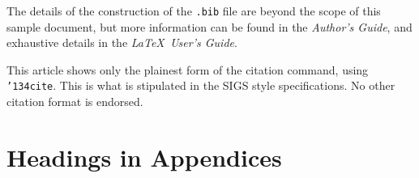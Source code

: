 \documentclass{acm_proc_article-sp}
\begin{document}
The details of the construction of the \texttt{.bib} file
are beyond the scope of this sample document, but more
information can be found in the \textit{Author's Guide},
and exhaustive details in the \textit{\LaTeX\ User's
Guide}\cite{Lamport:LaTeX}.

This article shows only the plainest form
of the citation command, using \texttt{{\char'134}cite}.
This is what is stipulated in the SIGS style specifications.
No other citation format is endorsed.

%

%
%
\appendix
\section{Headings in Appendices}
\balancecolumns
\end{document}
